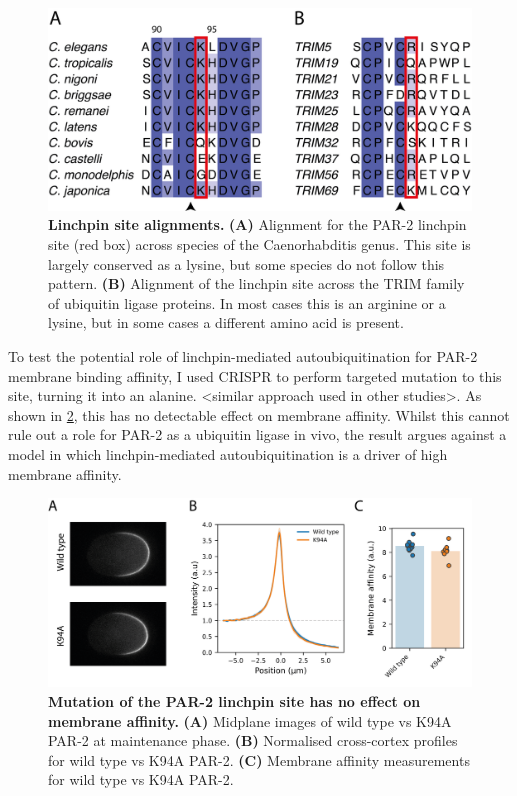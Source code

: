 \documentclass[12pt]{"article"}
\newcommand{\mycaption}[2]{\caption[#1]{\textbf{#1.} #2}}
\begin{document}
\begin{figure}
\includegraphics[scale=0.9]{linchpin_alignments}
\centering
\mycaption{Linchpin site alignments}{
\textbf{(A)} Alignment for the PAR-2 linchpin site (red box) across species of the Caenorhabditis genus. This site is largely conserved as a lysine, but some species do not follow this pattern.
\textbf{(B)} Alignment of the linchpin site across the TRIM family of ubiquitin ligase proteins. In most cases this is an arginine or a lysine, but in some cases a different amino acid is present.
}
\label{fig:linchpin_alignments}
\end{figure}

To test the potential role of linchpin-mediated autoubiquitination for PAR-2 membrane binding affinity, I used CRISPR to perform targeted mutation to this site, turning it into an alanine. <similar approach used in other studies>. As shown in \cref{fig:linchpin_in_vivo}, this has no detectable effect on membrane affinity. Whilst this cannot rule out a role for PAR-2 as a ubiquitin ligase in vivo, the result argues against a model in which linchpin-mediated autoubiquitination is a driver of high membrane affinity.\\


\begin{figure}
\includegraphics[scale=0.9]{linchpin_in_vivo}
\centering
\mycaption{Mutation of the PAR-2 linchpin site has no effect on membrane affinity}{
\textbf{(A)} Midplane images of wild type vs K94A PAR-2 at maintenance phase.
\textbf{(B)} Normalised cross-cortex profiles for wild type vs K94A PAR-2.
\textbf{(C)} Membrane affinity measurements for wild type vs K94A PAR-2.
}
\label{fig:linchpin_in_vivo}
\end{figure}
\end{document}
